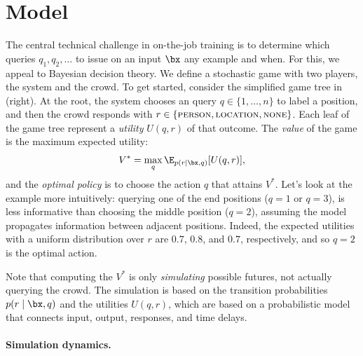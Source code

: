 \section{Model}
\label{sec:model}

The central technical challenge in on-the-job training
is to determine which queries $q_1, q_2, \dots$ to issue on an input $\bx$
any example and when.  For this, we appeal to Bayesian decision theory.
We define a stochastic game with two players, the system and the crowd.
To get started, consider the simplified game tree in (right).
At the root, the system chooses an query $q \in \{1, \dots, n\}$ to label a position,
and then the crowd responds with $r \in \{ \textsc{person}{}, \textsc{location}{}, \textsc{none}{} \}$.
Each leaf of the game tree represent a \emph{utility} $U(q, r)$ of that outcome.
The \emph{value} of the game is the maximum expected utility:
\begin{align}
  V^* = \max_q \E_{p(r \mid \bx, q)}[U(q, r)],
\end{align}
and the \emph{optimal policy} is to choose the action $q$ that attains $V^*$.
Let's look at the example more intuitively:
querying one of the end positions ($q = 1$ or $q = 3$),
is less informative than choosing the middle position ($q = 2$),
assuming the model propagates information between adjacent positions.
Indeed, the expected utilities with a uniform distribution over $r$
are $0.7$, $0.8$, and $0.7$, respectively, and so $q = 2$ is the optimal action.

Note that computing the $V^*$ is only \emph{simulating} possible futures,
not actually querying the crowd.  The simulation is based on the transition
probabilities $p(r \mid \bx, q)$ and the utilities $U(q, r)$, which are
based on a probabilistic model that connects input, output, responses, and time delays.

\paragraph{Simulation dynamics.}

